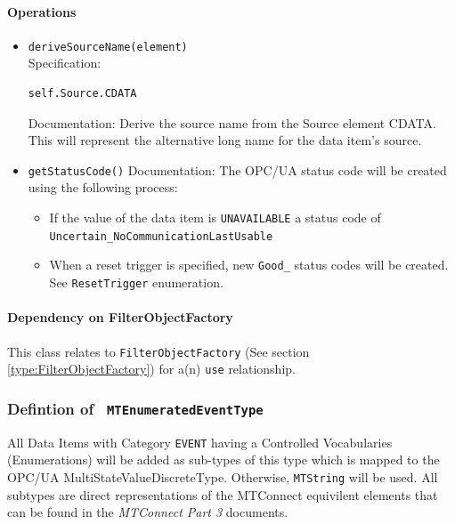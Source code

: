 \paragraph{Operations}
\begin{itemize}
  \item \texttt{deriveSourceName(element)}\\
    Specification:
   \indent \begin{lstlisting}
self.Source.CDATA
\end{lstlisting}

    Documentation: Derive the source name from the Source element CDATA. This will represent the alternative long name for the data item's source.

  \item \texttt{getStatusCode()}
    Documentation: The OPC/UA status code will be created using the following process:

\begin{itemize}
  \item If the value of the data item is \texttt{UNAVAILABLE} a status code of \texttt{Uncertain_NoCommunicationLastUsable}
  \item When a reset trigger is specified, new \texttt{Good_} status codes will be created. See \texttt{ResetTrigger} enumeration.
\end{itemize}

\end{itemize}
\paragraph{Dependency on FilterObjectFactory}

This class relates to \texttt{FilterObjectFactory} (See section \ref{type:FilterObjectFactory}) for a(n) \texttt{use} relationship.

\FloatBarrier
\subsubsection{Defintion of \texttt{ MTEnumeratedEventType}} \label{type:MTEnumeratedEventType}

\FloatBarrier

All Data Items with Category \texttt{EVENT} having a Controlled Vocabularies (Enumerations) 
will be added as sub-types of this type which is mapped to the OPC/UA MultiStateValueDiscreteType. 
Otherwise, \texttt{MTString} will be used. All subtypes are direct representations of the 
MTConnect equivilent elements that can be found in the \textit{MTConnect Part 3} documents.

